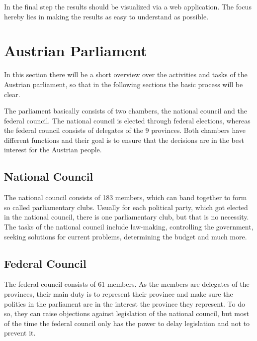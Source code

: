In the final step the results should be visualized via a web application. The focus hereby lies in making the results as easy to understand as possible.

\section{Austrian Parliament}
In this section there will be a short overview over the activities and tasks of the Austrian parliament, so that in the following sections the basic process will be clear.

The parliament basically consists of two chambers, the national council and the federal council. The national council is elected through federal elections, whereas the federal council consists of delegates of the 9 provinces. Both chambers have different functions and their goal is to ensure that the decisions are in the best interest for the Austrian people.

\subsection{National Council}
The national council consists of 183 members, which can band together to form so called parliamentary clubs. Usually for each political party, which got elected in the national council, there is one parliamentary club, but that is no necessity. The tasks of the national council include law-making, controlling the government, seeking solutions for current problems, determining the budget and much more. 

\subsection{Federal Council}
The federal council consists of 61 members. As the members are delegates of the provinces, their main duty is to represent their province and make sure the politics in the parliament are in the interest the province they represent. To do so, they can raise objections against legislation of the national council, but most of the time the federal council only has the power to delay legislation and not to prevent it.